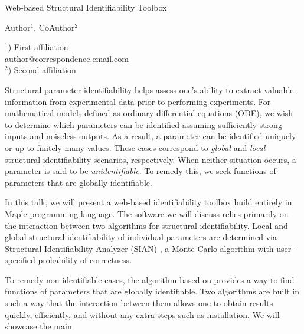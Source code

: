 \documentclass[a4paper]{article}
\begin{document}

\Large
\begin{center}
    Web-based Structural Identifiability Toolbox \\

    \hspace{10pt}

    \large
    Author$^1$, CoAuthor$^2$ \\

    \hspace{10pt}

    \small
    $^1$) First affiliation\\
    author@correspondence.email.com\\
    $^2$) Second affiliation

\end{center}

\hspace{10pt}

\normalsize


Structural parameter identifiability helps assess one's ability to extract valuable information from experimental data prior to performing experiments. For mathematical models defined as ordinary differential equations (ODE), we wish to determine which parameters can be identified assuming sufficiently strong inputs and noiseless outputs. As a result, a parameter can be identified uniquely or up to finitely many values. These cases correspond to \emph{global} and \emph{local} structural identifiability scenarios, respectively. When neither situation occurs, a parameter is said to be \emph{unidentifiable}. To remedy this, we seek functions of parameters that are globally identifiable.

In this talk, we will present a web-based identifiability toolbox build entirely in Maple programming language. The software we will discuss relies primarily on the interaction between two algorithms for structural identifiability. Local and global structural identifiability of individual parameters are determined via Structural Identifiability Analyzer (SIAN) \cite{hong_global_2020,hong_sian_2019}, a Monte-Carlo algorithm with user-specified probability of correctness.

To remedy non-identifiable cases, the algorithm based on \cite{ovchinnikov2020computing,ovchinnikov2020multi} provides a way to find functions of parameters that are globally identifiable. Two algorithms are built in such a way that the interaction between them allows one to obtain results quickly, efficiently, and without any extra steps such as installation. We will showcase the main

\printbibliography{}
\end{document}

